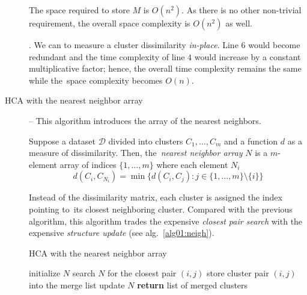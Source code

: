 \begin{description}
	The space required to store $M$ is $O(n^2)$. As there is no other non-trivial requirement, the overall space complexity is $O(n^2)$ as well. 
	\begin{rem}
		. We can  to measure a cluster dissimilarity \emph{in-place}. Line $6$ would become redundant and the time complexity of line $4$ would increase by a constant multiplicative factor; hence, the overall time complexity remains the same while the~space complexity becomes $O(n)$.
	\end{rem}
	

	\item[HCA with the nearest neighbor array] -- This algorithm introduces the array of the nearest neighbors.
	
	\begin{defn}
		Suppose a dataset $\mathcal{D}$ divided into clusters $C_1,\dots,C_m$ and a function $d$ as a measure of dissimilarity. Then, the~\emph{nearest neighbor array} $N$ is a $m$-element array of indices $\{1,\dots,m\}$ where each element $N_i$ 
		\begin{equation}
		d(C_i,C_{N_i}) = \min\{d(C_i,C_j) : j \in \{1,\dots,m\} \setminus \{i\}\}
		\label{eq01:neigh}
		\end{equation}
		
		\label{def01:neigh}
	\end{defn}
	
	 Instead of the dissimilarity matrix, each cluster is assigned the index pointing to~its closest neighboring cluster. 
	 Compared with the previous algorithm, this algorithm trades the expensive \emph{closest pair search} with the expensive \emph{structure update}  (see alg.~\ref{alg01:neigh}).
	
	
	
	\begin{algorithm}[t]
		\caption{HCA with the nearest neighbor array}
		\label{alg01:neigh}
		\begin{algorithmic}[1]
			\State initialize $N$
			\State search $N$ for the closest pair $(i,j)$ 
			\State store cluster pair $(i,j)$ into the merge list 
			\State update $N$ 
			\EndFor
			\State \textbf{return} list of merged clusters
			\EndProcedure
		\end{algorithmic}
	\end{algorithm}
	

\end{description}
